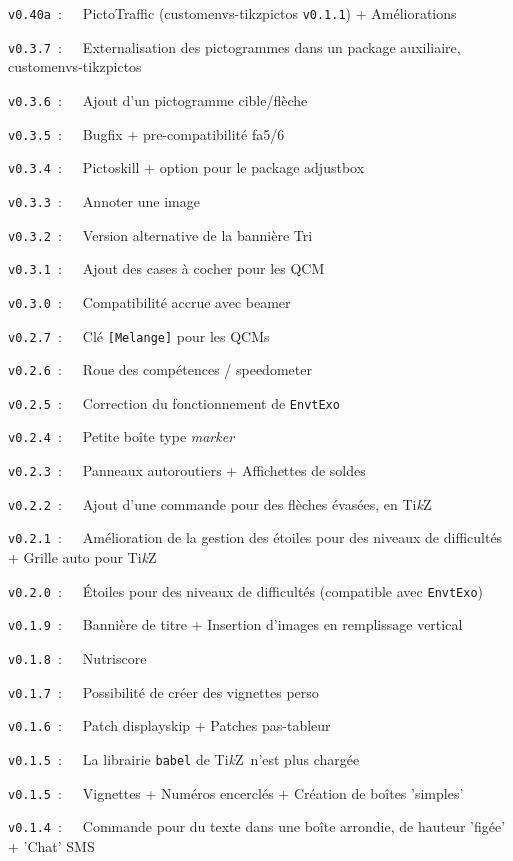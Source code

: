 \documentclass[french,11pt,a4paper]{article}
\providecommand\tikzlogo{Ti\textit{k}Z}
\let\TikZ\tikzlogo
\begin{document}
\verb|v0.40a|~:~~~PictoTraffic (\textsf{customenvs-tikzpictos} \texttt{v0.1.1}) + Améliorations

\verb|v0.3.7|~:~~~Externalisation des pictogrammes dans un package auxiliaire, \textsf{customenvs-tikzpictos}

\verb|v0.3.6|~:~~~Ajout d'un pictogramme \textsf{cible/flèche}

\verb|v0.3.5|~:~~~Bugfix + pre-compatibilité \textsf{fa5/6}

\verb|v0.3.4|~:~~~Pictoskill + option pour le package \textsf{adjustbox}

\verb|v0.3.3|~:~~~Annoter une image

\verb|v0.3.2|~:~~~Version alternative de la bannière \textsf{Tri}

\verb|v0.3.1|~:~~~Ajout des cases à cocher pour les \textsf{QCM}

\verb|v0.3.0|~:~~~Compatibilité accrue avec \textsf{beamer}

\verb|v0.2.7|~:~~~Clé \texttt{[Melange]} pour les QCMs

\verb|v0.2.6|~:~~~Roue des compétences / speedometer

\verb|v0.2.5|~:~~~Correction du fonctionnement de \texttt{EnvtExo}

\verb|v0.2.4|~:~~~Petite boîte type \textit{marker}

\verb|v0.2.3|~:~~~Panneaux autoroutiers + Affichettes de soldes

\verb|v0.2.2|~:~~~Ajout d'une commande pour des flèches évasées, en \TikZ\

\verb|v0.2.1|~:~~~Amélioration de la gestion des étoiles pour des niveaux de difficultés + Grille auto pour \TikZ\

\verb|v0.2.0|~:~~~Étoiles pour des niveaux de difficultés (compatible avec \texttt{EnvtExo})

\verb|v0.1.9|~:~~~Bannière de titre + Insertion d'images en remplissage vertical

\verb|v0.1.8|~:~~~Nutriscore

\verb|v0.1.7|~:~~~Possibilité de créer des vignettes \textsf{perso}

\verb|v0.1.6|~:~~~Patch \textsf{displayskip} + Patches \textsf{pas-tableur}

\verb|v0.1.5|~:~~~La librairie \texttt{babel} de \TikZ\ n'est plus chargée

\verb|v0.1.5|~:~~~Vignettes + Numéros encerclés + Création de boîtes 'simples'

\verb|v0.1.4|~:~~~Commande pour du texte dans une boîte arrondie, de hauteur 'figée' + 'Chat' SMS
\end{document}

